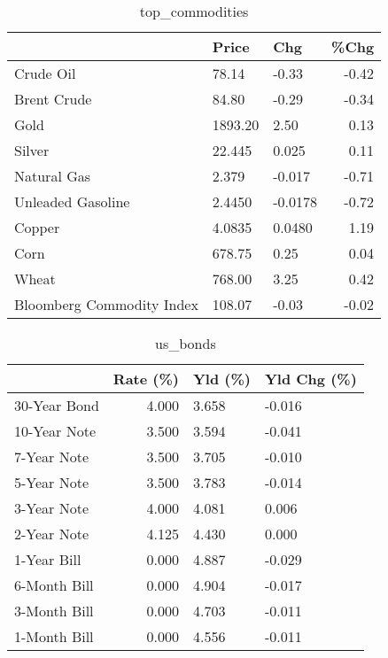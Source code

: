 \documentclass{article}%
\begin{document}
\begin{table}[htbp]%
\caption{top\_commodities}%
\centering%
\begin{adjustbox}{width=1\textwidth}%
\begin{tabular}{lllr}
\toprule
                          &   Price &     Chg &  \%Chg \\
\midrule
               Crude Oil  &   78.14 &   -0.33 & -0.42 \\
             Brent Crude  &   84.80 &   -0.29 & -0.34 \\
                    Gold  & 1893.20 &    2.50 &  0.13 \\
                  Silver  &  22.445 &   0.025 &  0.11 \\
             Natural Gas  &   2.379 &  -0.017 & -0.71 \\
       Unleaded Gasoline  &  2.4450 & -0.0178 & -0.72 \\
                  Copper  &  4.0835 &  0.0480 &  1.19 \\
                    Corn  &  678.75 &    0.25 &  0.04 \\
                   Wheat  &  768.00 &    3.25 &  0.42 \\
Bloomberg Commodity Index &  108.07 &   -0.03 & -0.02 \\
\bottomrule
\end{tabular}
%
\end{adjustbox}%
\end{table}

%


\begin{table}[htbp]%
\caption{us\_bonds}%
\centering%
\begin{adjustbox}{width=1\textwidth}%
\begin{tabular}{lrll}
\toprule
             &  Rate (\%) & Yld (\%) & Yld Chg (\%) \\
\midrule
30-Year Bond &     4.000 &   3.658 &      -0.016 \\
10-Year Note &     3.500 &   3.594 &      -0.041 \\
 7-Year Note &     3.500 &   3.705 &      -0.010 \\
 5-Year Note &     3.500 &   3.783 &      -0.014 \\
 3-Year Note &     4.000 &   4.081 &       0.006 \\
 2-Year Note &     4.125 &   4.430 &       0.000 \\
 1-Year Bill &     0.000 &   4.887 &      -0.029 \\
6-Month Bill &     0.000 &   4.904 &      -0.017 \\
3-Month Bill &     0.000 &   4.703 &      -0.011 \\
1-Month Bill &     0.000 &   4.556 &      -0.011 \\
\bottomrule
\end{tabular}
%
\end{adjustbox}%
\end{table}
\end{document}
